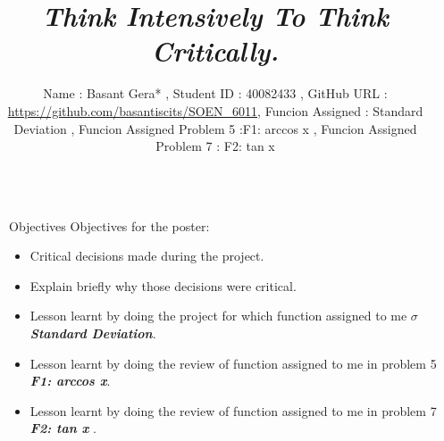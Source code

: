 \documentclass[final]{beamer}
\title{\textit{Think Intensively To Think Critically.}} %
\author{Name : Basant Gera*  ,  Student ID : 40082433 , GitHub URL : \url{https://github.com/basantiscits/SOEN\_6011}, Funcion Assigned : Standard Deviation , Funcion Assigned Problem 5 :F1: arccos x , Funcion Assigned Problem 7 : F2: tan x} %
\institute{Submitted to Pankaj Kamthan*} %
\newlength{\sepwid}
\newlength{\onecolwid}
\begin{document}

\setlength{\belowcaptionskip}{2ex} %
\setlength\belowdisplayshortskip{2ex} %

\begin{frame}[t] %

\begin{columns}[t] %

\begin{column}{\sepwid}\end{column} %

\begin{column}{\onecolwid} %


\begin{alertblock}{Objectives}
Objectives for the poster:
\begin{itemize}
\item Critical decisions made during the project.\newline
\item Explain briefly why those decisions were critical.\newline
\item Lesson learnt by doing the project for which function assigned to me $\sigma$ \textbf{\textit{Standard Deviation}}.\newline
\item Lesson learnt by doing the review of function assigned to me in problem 5  \textbf{\textit{ F1: arccos x}}.\newline
\item Lesson learnt by doing the review of function assigned to me in problem 7  \textbf{\textit{F2: tan x}} .\newline
\end{itemize}

\end{alertblock}


\end{column}
\end{columns}
\end{frame}
\end{document}
